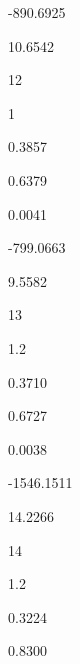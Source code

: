 \documentclass[a4paper,portrait,12pt]{article}
\begin{document}
-890.6925





10.6542





12





1





0.3857





0.6379





0.0041





-799.0663





9.5582





13





1.2





0.3710





0.6727





0.0038





-1546.1511





14.2266





14





1.2





0.3224





0.8300
\end{document}
